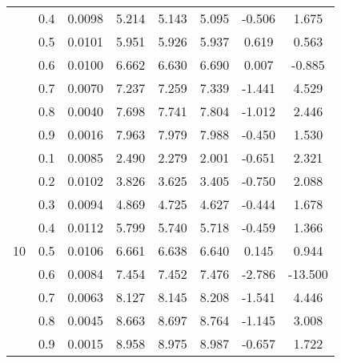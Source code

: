 \documentclass[11pt,a4paper]{report}
\begin{document}
\begin{longtable}{ | c | c || c | c | c | c | c | c | }
 & 0.4 & 0.0098 & 5.214 & 5.143 & 5.095 & -0.506 & 1.675 \\
 & 0.5 & 0.0101 & 5.951 & 5.926 & 5.937 & 0.619 & 0.563 \\
 & 0.6 & 0.0100 & 6.662 & 6.630 & 6.690 & 0.007 & -0.885 \\
 & 0.7 & 0.0070 & 7.237 & 7.259 & 7.339 & -1.441 & 4.529 \\
 & 0.8 & 0.0040 & 7.698 & 7.741 & 7.804 & -1.012 & 2.446 \\
 & 0.9 & 0.0016 & 7.963 & 7.979 & 7.988 & -0.450 & 1.530 \\
 \hline
\multirow{9}{*}{10} & 0.1 & 0.0085 & 2.490 & 2.279 & 2.001 & -0.651 & 2.321 \\
 & 0.2 & 0.0102 & 3.826 & 3.625 & 3.405 & -0.750 & 2.088 \\
 & 0.3 & 0.0094 & 4.869 & 4.725 & 4.627 & -0.444 & 1.678 \\
 & 0.4 & 0.0112 & 5.799 & 5.740 & 5.718 & -0.459 & 1.366 \\
 & 0.5 & 0.0106 & 6.661 & 6.638 & 6.640 & 0.145 & 0.944 \\
 & 0.6 & 0.0084 & 7.454 & 7.452 & 7.476 & -2.786 & -13.500 \\
 & 0.7 & 0.0063 & 8.127 & 8.145 & 8.208 & -1.541 & 4.446 \\
 & 0.8 & 0.0045 & 8.663 & 8.697 & 8.764 & -1.145 & 3.008 \\
 & 0.9 & 0.0015 & 8.958 & 8.975 & 8.987 & -0.657 & 1.722 \\
 \hline
\hline
\end{longtable}
\end{document}
